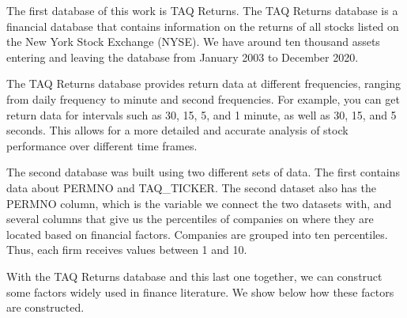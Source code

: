 The first database of this work is TAQ Returns. The TAQ Returns database is a financial database that contains information on the returns of all stocks listed on the New York Stock Exchange (NYSE). We have around ten thousand assets entering and leaving the database from January 2003 to December 2020.

The TAQ Returns database provides return data at different frequencies, ranging from daily frequency to minute and second frequencies. For example, you can get return data for intervals such as 30, 15, 5, and 1 minute, as well as 30, 15, and 5 seconds. This allows for a more detailed and accurate analysis of stock performance over different time frames.

The second database was built using two different sets of data. The first contains data about PERMNO and TAQ\_TICKER. The second dataset also has the PERMNO column, which is the variable we connect the two datasets with, and several columns that give us the percentiles of companies on where they are located based on financial factors. Companies are grouped into ten percentiles. Thus, each firm receives values between 1 and 10.

With the TAQ Returns database and this last one together, we can construct some factors widely used in finance literature. We show below how these factors are constructed.


